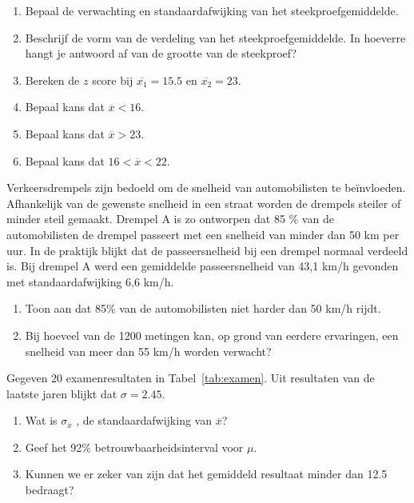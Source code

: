 {\begin{exercise}
  \begin{enumerate}[label=\alph*.]
    \item Bepaal de verwachting en standaardafwijking van het steekproefgemiddelde.
    \item Beschrijf de vorm van de verdeling van het steekproefgemiddelde. In hoeverre hangt je antwoord af van de grootte van de steekproef?
    \item Bereken de $z$ score bij $\overline{x_{1}} = 15.5$ en $\overline{x_{2}} = 23$.
    \item Bepaal kans dat $\overline{x} <16$.
    \item Bepaal kans dat $\overline{x} > 23$.
    \item Bepaal kans dat $16< \overline{x}< 22$.
  \end{enumerate}
\end{exercise}

\begin{exercise}
  Verkeersdrempels zijn bedoeld om de snelheid van automobilisten te be\"invloeden. Afhankelijk van de gewenste snelheid in een straat worden de drempels steiler of minder steil gemaakt. Drempel A is zo ontworpen dat 85 \% van de automobilisten de drempel passeert met een snelheid van minder dan 50 km per uur. In de praktijk blijkt dat de passeersnelheid bij een drempel normaal verdeeld is. Bij drempel A werd een gemiddelde passeersnelheid van 43,1 km/h gevonden met standaardafwijking 6,6 km/h.

  \begin{enumerate}[label=\alph*.]
    \item Toon aan dat 85\% van de automobilisten niet harder dan 50 km/h rijdt.
    \item Bij hoeveel van de 1200 metingen kan, op grond van eerdere ervaringen, een snelheid van meer dan 55 km/h worden verwacht?
  \end{enumerate}
\end{exercise}

\begin{exercise}
  Gegeven 20 examenresultaten in Tabel~\ref{tab:examen}. Uit resultaten van de laatste jaren blijkt dat $\sigma = 2.45$.

  \begin{enumerate}[label=\alph*.]
    \item Wat is $\sigma_{\overline{x}}$ , de standaardafwijking van $\overline{x}$?
    \item Geef het 92\% betrouwbaarheidsinterval voor $\mu$.
    \item Kunnen we er zeker van zijn dat het gemiddeld resultaat minder dan 12.5 bedraagt?
  \end{enumerate}
\end{exercise}

}
